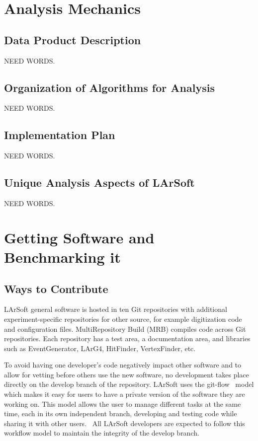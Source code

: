 \documentclass[12pt]{elsarticle}
\newcommand{\larsoft}{LArSoft }
\begin{document}
               
\section{Analysis Mechanics}

\subsection{Data Product Description}
NEED WORDS.

\subsection{Organization of Algorithms for Analysis}
NEED WORDS.

\subsection{Implementation Plan}
NEED WORDS.

\subsection{Unique Analysis Aspects of \larsoft}
NEED WORDS.

\section{Getting Software and Benchmarking it}
\subsection{Ways to Contribute}

\larsoft general software is hosted in ten Git repositories with additional experiment-specific repositories for other source, for example digitization code and configuration files. MultiRepository Build (MRB) compiles code across Git repositories. Each repository has a test area, a documentation area, and libraries such as EventGenerator, LArG4, HitFinder, VertexFinder, etc.~\cite{gian}

To avoid having one developer's code negatively impact other software and to allow for vetting before others use the new software, no development takes place directly on the develop branch of the repository. \larsoft uses the git-flow~\cite{git-flow} model which makes it easy for users to have a private version of the software they are working on. This model allows the user to manage different tasks at the same time, each in its own independent branch, developing and testing code while sharing it with other users.~\cite{git-control} All \larsoft developers are expected to follow this workflow model to maintain the integrity of the develop branch.
\end{document}
